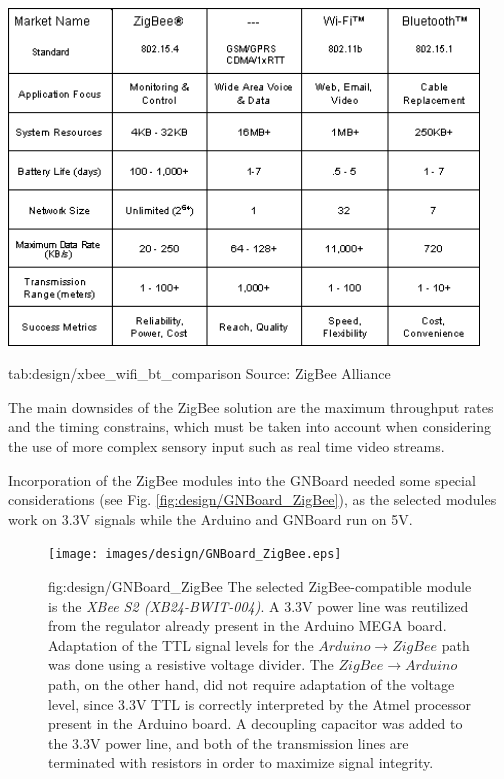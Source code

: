 \begin{table}[h!]
\centerline{\mbox{\includegraphics[width=12.5cm]{images/design/xbee_wifi_bt_comparison.png}}}
{tab:design/xbee_wifi_bt_comparison}{
Source: ZigBee Alliance
}\end{table}


The main downsides of the ZigBee solution are the maximum throughput rates and the timing constrains, which must be taken into account when considering the use of more complex sensory input such as real time video streams.

Incorporation of the ZigBee modules into the GNBoard needed some special considerations (see Fig. \ref{fig:design/GNBoard_ZigBee}), as the selected modules work on 3.3V signals while the Arduino and GNBoard run on 5V.

\begin{figure}[h!]
\centerline{\mbox{\texttt{[image: images/design/GNBoard\_ZigBee.eps]}}}
{fig:design/GNBoard_ZigBee}{
The selected ZigBee-compatible module is the \emph{XBee S2 (XB24-BWIT-004)}.
A 3.3V power line was reutilized from the regulator already present in the Arduino MEGA board. Adaptation of the TTL signal levels for the $Arduino \rightarrow ZigBee$ path was done using a resistive voltage divider. The $ZigBee \rightarrow Arduino$ path, on the other hand, did not require adaptation of the voltage level, since 3.3V TTL is correctly interpreted by the Atmel processor present in the Arduino board.
A decoupling capacitor was added to the 3.3V power line, and both of the transmission lines are terminated with resistors in order to maximize signal integrity.
}\end{figure}




